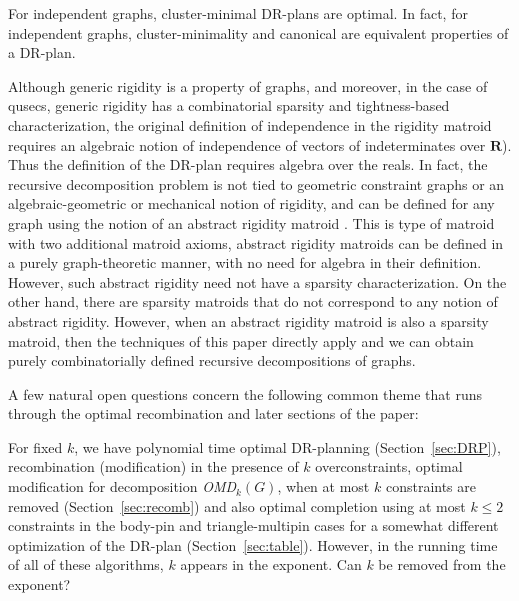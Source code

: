 \begin{conjecture}
\label{conj:mfaisoptimal:rephrase}
For independent graphs, cluster-minimal DR-plans are optimal. In fact, for independent graphs, cluster-minimality and canonical are equivalent properties of a DR-plan.
\end{conjecture}


\begin{openproblem}
\label{open:sparsitymatroid}
Although generic rigidity is a property of graphs, and moreover,  in the case of qusecs, generic rigidity has a combinatorial sparsity and tightness-based characterization, the original definition of independence in the rigidity matroid requires an algebraic notion of independence of vectors of indeterminates over $\mathbf{R}$). Thus the definition of the DR-plan requires algebra over the reals.
In fact, the recursive decomposition problem is not tied to geometric constraint graphs or
an algebraic-geometric or mechanical notion of rigidity, and can be defined for any graph using
the notion of an abstract rigidity matroid \cite{graver93book}. This is  type of matroid with two additional matroid axioms,  abstract rigidity matroids can be defined in a purely graph-theoretic manner,  with no need for algebra in their definition. However, such abstract rigidity need not have a sparsity characterization. On the other hand, there are sparsity matroids that do not correspond to any notion of abstract rigidity.
However, when an abstract rigidity matroid is also a sparsity matroid, then the techniques of this
paper  directly apply and we can obtain purely combinatorially defined recursive decompositions of graphs.
\end{openproblem}


A few natural  open questions concern the following common theme that runs through the optimal recombination and later sections of the paper:

\begin{openproblem}
    For fixed $k$, we have polynomial time optimal DR-planning (Section~\ref{sec:DRP}), recombination (modification) in the presence of $k$ overconstraints, optimal modification for decomposition {\sl OMD}$_k(G)$, when at most $k$ constraints are removed (Section~\ref{sec:recomb}) and also optimal completion using at most $k\le 2$ constraints in the body-pin and triangle-multipin cases for a somewhat different optimization of the DR-plan (Section~\ref{sec:table}). However, in the running time of all of these algorithms, $k$ appears in the exponent.  Can $k$ be removed from the exponent?
\end{openproblem}

